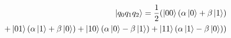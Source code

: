 \documentclass[preview]{standalone}
\begin{document}
\begin{align*}
\ket{q_0 q_1 q_2}= \frac{1}{2}( \ket{00}(\alpha \ket{0} + \beta \ket{1})\\ + \ket{01}( \alpha \ket{1} + \beta \ket{0}) +\ket{10} (\alpha \ket{0} - \beta \ket{1}) +\ket{11}(\alpha \ket{1} - \beta \ket{0}))
\end{align*}
\end{document}
